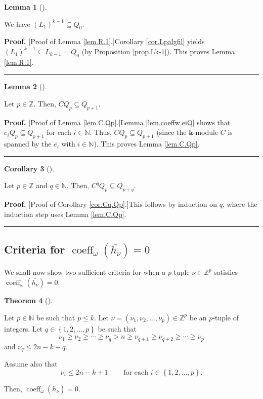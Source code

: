 \documentclass[numbers=enddot,12pt,final,onecolumn,notitlepage]{scrartcl}%
\theoremstyle{definition}
\newtheorem{theo}{Theorem}[section]
\newenvironment{theorem}[1][]
{\begin{theo}[#1]\begin{leftbar}}
{\end{leftbar}\end{theo}}
\newtheorem{lem}[theo]{Lemma}
\newenvironment{lemma}[1][]
{\begin{lem}[#1]\begin{leftbar}}
{\end{leftbar}\end{lem}}
\newtheorem{coro}[theo]{Corollary}
\newenvironment{corollary}[1][]
{\begin{coro}[#1]\begin{leftbar}}
{\end{leftbar}\end{coro}}
\newenvironment{proof}[1][Proof]{\noindent\textbf{#1.} }{\ \rule{0.5em}{0.5em}}
\begin{document}
\begin{lemma}
\label{lem.R.1}We have $\left(  L_{1}\right)  ^{k-1}\subseteq Q_{0}$.
\end{lemma}

\begin{proof}
[Proof of Lemma \ref{lem.R.1}.]Corollary \ref{cor.Lpalgfil} yields $\left(
L_{1}\right)  ^{k-1}\subseteq L_{k-1}=Q_{0}$ (by Proposition \ref{prop.Lk-1}).
This proves Lemma \ref{lem.R.1}.
\end{proof}

\begin{lemma}
\label{lem.C.Qp}Let $p\in\mathbb{Z}$. Then, $CQ_{p}\subseteq Q_{p+1}$.
\end{lemma}

\begin{proof}
[Proof of Lemma \ref{lem.C.Qp}.]Lemma \ref{lem.coeffw.eiQ} shows that
$\overline{e_{i}}Q_{p}\subseteq Q_{p+1}$ for each $i\in\mathbb{N}$. Thus,
$CQ_{p}\subseteq Q_{p+1}$ (since the $\mathbf{k}$-module $C$ is spanned by the
$\overline{e_{i}}$ with $i\in\mathbb{N}$). This proves Lemma \ref{lem.C.Qp}.
\end{proof}

\begin{corollary}
\label{cor.Cq.Qp}Let $p\in\mathbb{Z}$ and $q\in\mathbb{N}$. Then, $C^{q}%
Q_{p}\subseteq Q_{p+q}$.
\end{corollary}

\begin{proof}
[Proof of Corollary \ref{cor.Cq.Qp}.]This follows by induction on $q$, where
the induction step uses Lemma \ref{lem.C.Qp}.
\end{proof}

\subsection{Criteria for $\operatorname*{coeff}\nolimits_{\omega}\left(
\overline{h_{\nu}}\right)  =0$}

We shall now show two sufficient criteria for when a $p$-tuple $\nu
\in\mathbb{Z}^{p}$ satisfies $\operatorname*{coeff}\nolimits_{\omega}\left(
\overline{h_{\nu}}\right)  =0$.

\begin{theorem}
\label{thm.coeff-h.1}Let $p\in\mathbb{N}$ be such that $p\leq k$. Let
$\nu=\left(  \nu_{1},\nu_{2},\ldots,\nu_{p}\right)  \in\mathbb{Z}^{p}$ be an
$p$-tuple of integers. Let $q\in\left\{  1,2,\ldots,p\right\}  $ be such that%
\[
\nu_{1}\geq\nu_{2}\geq\cdots\geq\nu_{q}>n\geq\nu_{q+1}\geq\nu_{q+2}\geq
\cdots\geq\nu_{p}%
\]
and $\nu_{q}\leq2n-k-q$.

Assume also that
\begin{equation}
\nu_{i}\leq2n-k+1\ \ \ \ \ \ \ \ \ \ \text{for each }i\in\left\{
1,2,\ldots,p\right\}  . \label{eq.thm.coeff-h.1.ass1}%
\end{equation}


Then, $\operatorname*{coeff}\nolimits_{\omega}\left(  \overline{h_{\nu}%
}\right)  =0$.
\end{theorem}
\end{document}

